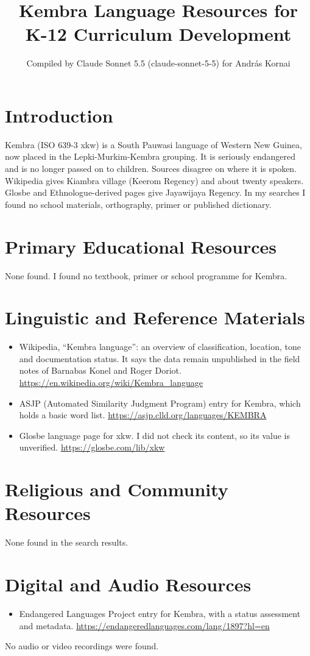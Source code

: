 \documentclass[12pt]{article}
\title{Kembra Language Resources for K-12 Curriculum Development}
\author{Compiled by Claude Sonnet 5.5 (claude-sonnet-5-5) for Andr\'as Kornai}
\date{}
\begin{document}
\maketitle

\section{Introduction}
Kembra (ISO 639-3 xkw) is a South Pauwasi language of Western New Guinea, now placed in the Lepki-Murkim-Kembra grouping. It is seriously endangered and is no longer passed on to children. Sources disagree on where it is spoken. Wikipedia gives Kiambra village (Keerom Regency) and about twenty speakers. Glosbe and Ethnologue-derived pages give Jayawijaya Regency. In my searches I found no school materials, orthography, primer or published dictionary.

\section{Primary Educational Resources}
None found. I found no textbook, primer or school programme for Kembra.

\section{Linguistic and Reference Materials}
\begin{itemize}
\item Wikipedia, ``Kembra language'': an overview of classification, location, tone and documentation status. It says the data remain unpublished in the field notes of Barnabas Konel and Roger Doriot. \url{https://en.wikipedia.org/wiki/Kembra_language}
\item ASJP (Automated Similarity Judgment Program) entry for Kembra, which holds a basic word list. \url{https://asjp.clld.org/languages/KEMBRA}
\item Glosbe language page for xkw. I did not check its content, so its value is unverified. \url{https://glosbe.com/lib/xkw}
\end{itemize}

\section{Religious and Community Resources}
None found in the search results.

\section{Digital and Audio Resources}
\begin{itemize}
\item Endangered Languages Project entry for Kembra, with a status assessment and metadata. \url{https://endangeredlanguages.com/lang/1897?hl=en}
\end{itemize}
No audio or video recordings were found.
\end{document}

